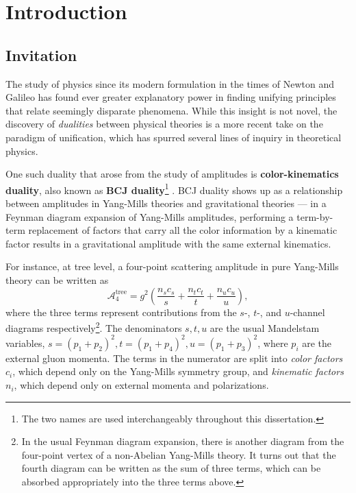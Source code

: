 \chapter{Introduction}

\section{Invitation}

The study of physics since its modern formulation in the times of Newton
and Galileo has found ever greater explanatory power in finding unifying
principles that relate seemingly disparate phenomena. While this insight
is not novel, the discovery of \emph{dualities} between physical
theories is a more recent take on the paradigm of unification, which has
spurred several lines of inquiry in theoretical physics. 

One such duality that arose from the study of amplitudes is \textbf{color-kinematics duality}, also known as \textbf{BCJ
duality}\footnote{The two names are used interchangeably throughout this dissertation.} \cite{Bern:2008qj}. BCJ
duality shows up as a relationship between amplitudes in Yang-Mills theories and gravitational theories --- in a
Feynman diagram expansion of Yang-Mills amplitudes, performing a term-by-term replacement of factors that
carry all the color information by a kinematic factor results in a gravitational amplitude with the same external
kinematics.

For instance, at tree level, a four-point scattering amplitude in pure Yang-Mills theory can be written as
\cite{Bern:2008qj}
\begin{equation} \label{intro:eq:YM4point} 
    \mathcal{A}^{\text{tree}}_{4} = g^{2} \left( \frac{n_{s}c_{s}}{s} + \frac{n_{t}c_{t}}{t} +
    \frac{n_{u}c_{u}}{u}\right),
\end{equation}
where the three terms represent contributions from the $s$-, $t$-, and $u$-channel diagrams
respectively\footnote{In the usual Feynman diagram expansion, there is another diagram from the four-point vertex
    of a non-Abelian Yang-Mills theory. It turns out that the fourth diagram can be written as the sum of three
terms, which can be absorbed appropriately into the three terms above.}. The
denominators $s,t,u$ are the usual Mandelstam variables, $s = (p_{1} + p_{2})^{2}, t = (p_{1} + p_{4})^{2}, u =
(p_{1} + p_{3})^{2}$, where $p_{i}$ are the external gluon momenta. The terms in the numerator are split into
\textit{color factors} $c_{i}$, which depend only on the Yang-Mills symmetry group, and \textit{kinematic factors}
$n_{i}$, which depend only on external momenta and polarizations.

